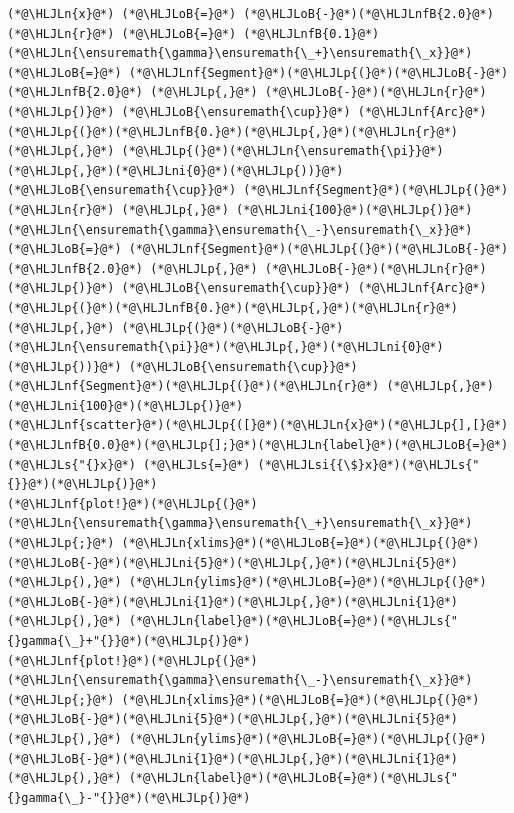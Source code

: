 \documentclass[12pt,a4paper]{article}
\newcommand{\HLJLn}[1]{#1}
\newcommand{\HLJLnf}[1]{\textcolor[RGB]{66,102,213}{#1}}
\newcommand{\HLJLs}[1]{\textcolor[RGB]{201,61,57}{#1}}
\newcommand{\HLJLsi}[1]{#1}
\newcommand{\HLJLnfB}[1]{\textcolor[RGB]{59,151,46}{#1}}
\newcommand{\HLJLni}[1]{\textcolor[RGB]{59,151,46}{#1}}
\newcommand{\HLJLoB}[1]{\textcolor[RGB]{102,102,102}{\textbf{#1}}}
\newcommand{\HLJLp}[1]{#1}
\begin{document}
\begin{lstlisting}
(*@\HLJLn{x}@*) (*@\HLJLoB{=}@*) (*@\HLJLoB{-}@*)(*@\HLJLnfB{2.0}@*)
(*@\HLJLn{r}@*) (*@\HLJLoB{=}@*) (*@\HLJLnfB{0.1}@*)
(*@\HLJLn{\ensuremath{\gamma}\ensuremath{\_+}\ensuremath{\_x}}@*) (*@\HLJLoB{=}@*) (*@\HLJLnf{Segment}@*)(*@\HLJLp{(}@*)(*@\HLJLoB{-}@*)(*@\HLJLnfB{2.0}@*) (*@\HLJLp{,}@*) (*@\HLJLoB{-}@*)(*@\HLJLn{r}@*)(*@\HLJLp{)}@*) (*@\HLJLoB{\ensuremath{\cup}}@*) (*@\HLJLnf{Arc}@*)(*@\HLJLp{(}@*)(*@\HLJLnfB{0.}@*)(*@\HLJLp{,}@*)(*@\HLJLn{r}@*)(*@\HLJLp{,}@*) (*@\HLJLp{(}@*)(*@\HLJLn{\ensuremath{\pi}}@*)(*@\HLJLp{,}@*)(*@\HLJLni{0}@*)(*@\HLJLp{))}@*) (*@\HLJLoB{\ensuremath{\cup}}@*) (*@\HLJLnf{Segment}@*)(*@\HLJLp{(}@*)(*@\HLJLn{r}@*) (*@\HLJLp{,}@*) (*@\HLJLni{100}@*)(*@\HLJLp{)}@*)
(*@\HLJLn{\ensuremath{\gamma}\ensuremath{\_-}\ensuremath{\_x}}@*) (*@\HLJLoB{=}@*) (*@\HLJLnf{Segment}@*)(*@\HLJLp{(}@*)(*@\HLJLoB{-}@*)(*@\HLJLnfB{2.0}@*) (*@\HLJLp{,}@*) (*@\HLJLoB{-}@*)(*@\HLJLn{r}@*)(*@\HLJLp{)}@*) (*@\HLJLoB{\ensuremath{\cup}}@*) (*@\HLJLnf{Arc}@*)(*@\HLJLp{(}@*)(*@\HLJLnfB{0.}@*)(*@\HLJLp{,}@*)(*@\HLJLn{r}@*)(*@\HLJLp{,}@*) (*@\HLJLp{(}@*)(*@\HLJLoB{-}@*)(*@\HLJLn{\ensuremath{\pi}}@*)(*@\HLJLp{,}@*)(*@\HLJLni{0}@*)(*@\HLJLp{))}@*) (*@\HLJLoB{\ensuremath{\cup}}@*) (*@\HLJLnf{Segment}@*)(*@\HLJLp{(}@*)(*@\HLJLn{r}@*) (*@\HLJLp{,}@*) (*@\HLJLni{100}@*)(*@\HLJLp{)}@*)
(*@\HLJLnf{scatter}@*)(*@\HLJLp{([}@*)(*@\HLJLn{x}@*)(*@\HLJLp{],[}@*)(*@\HLJLnfB{0.0}@*)(*@\HLJLp{];}@*)(*@\HLJLn{label}@*)(*@\HLJLoB{=}@*)(*@\HLJLs{"{}x}@*) (*@\HLJLs{=}@*) (*@\HLJLsi{{\$}x}@*)(*@\HLJLs{"{}}@*)(*@\HLJLp{)}@*)
(*@\HLJLnf{plot!}@*)(*@\HLJLp{(}@*)(*@\HLJLn{\ensuremath{\gamma}\ensuremath{\_+}\ensuremath{\_x}}@*) (*@\HLJLp{;}@*) (*@\HLJLn{xlims}@*)(*@\HLJLoB{=}@*)(*@\HLJLp{(}@*)(*@\HLJLoB{-}@*)(*@\HLJLni{5}@*)(*@\HLJLp{,}@*)(*@\HLJLni{5}@*)(*@\HLJLp{),}@*) (*@\HLJLn{ylims}@*)(*@\HLJLoB{=}@*)(*@\HLJLp{(}@*)(*@\HLJLoB{-}@*)(*@\HLJLni{1}@*)(*@\HLJLp{,}@*)(*@\HLJLni{1}@*)(*@\HLJLp{),}@*) (*@\HLJLn{label}@*)(*@\HLJLoB{=}@*)(*@\HLJLs{"{}gamma{\_}+"{}}@*)(*@\HLJLp{)}@*)
(*@\HLJLnf{plot!}@*)(*@\HLJLp{(}@*)(*@\HLJLn{\ensuremath{\gamma}\ensuremath{\_-}\ensuremath{\_x}}@*)(*@\HLJLp{;}@*) (*@\HLJLn{xlims}@*)(*@\HLJLoB{=}@*)(*@\HLJLp{(}@*)(*@\HLJLoB{-}@*)(*@\HLJLni{5}@*)(*@\HLJLp{,}@*)(*@\HLJLni{5}@*)(*@\HLJLp{),}@*) (*@\HLJLn{ylims}@*)(*@\HLJLoB{=}@*)(*@\HLJLp{(}@*)(*@\HLJLoB{-}@*)(*@\HLJLni{1}@*)(*@\HLJLp{,}@*)(*@\HLJLni{1}@*)(*@\HLJLp{),}@*) (*@\HLJLn{label}@*)(*@\HLJLoB{=}@*)(*@\HLJLs{"{}gamma{\_}-"{}}@*)(*@\HLJLp{)}@*)
\end{lstlisting}
\end{document}
